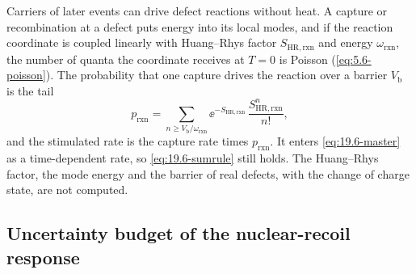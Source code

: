 Carriers of later events can drive defect reactions without heat. A capture or recombination at a defect puts energy into its local modes, and if the reaction coordinate is coupled linearly with Huang--Rhys factor $S_{\mathrm{HR,rxn}}$ and energy $\omega_{\mathrm{rxn}}$, the number of quanta the coordinate receives at $T = 0$ is Poisson (\cref{eq:5.6-poisson}). The probability that one capture drives the reaction over a barrier $V_{\mathrm{b}}$ is the tail
\begin{equation}
  p_{\mathrm{rxn}} = \sum_{n \ge V_{\mathrm{b}}/\omega_{\mathrm{rxn}}}\ee^{-S_{\mathrm{HR,rxn}}}\,\frac{S_{\mathrm{HR,rxn}}^n}{n!} ,
  \label{eq:19.6-prxn}
\end{equation}
and the stimulated rate is the capture rate times $p_{\mathrm{rxn}}$. It enters \cref{eq:19.6-master} as a time-dependent rate, so \cref{eq:19.6-sumrule} still holds. The Huang--Rhys factor, the mode energy and the barrier of real defects, with the change of charge state, are not computed.

\subsection{Uncertainty budget of the nuclear-recoil response}\label{sec:19.6-budget}

